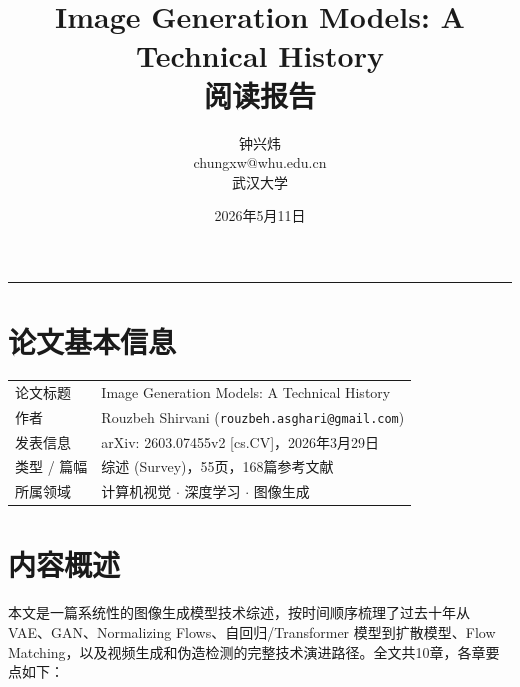 \documentclass[11pt,a4paper]{ctexart}
\title{{\bfseries Image Generation Models: A Technical History\\[3mm] 阅读报告}}
\author{%
    \large 钟兴炜\\[2mm]
    \normalsize chungxw@whu.edu.cn\\[1mm]
    \small 武汉大学
}
\date{\small 2026年5月11日}
\begin{document}
\maketitle
\thispagestyle{empty}

\vspace{3mm}
\begin{center}
\rule{0.7\textwidth}{0.5pt}
\end{center}
\vspace{3mm}

\section{论文基本信息}

\begin{tabularx}{\textwidth}{@{}l>{\raggedright\arraybackslash}X@{}}
\toprule
论文标题  & Image Generation Models: A Technical History \\
作者      & Rouzbeh Shirvani \quad (\texttt{rouzbeh.asghari@gmail.com}) \\
发表信息  & arXiv: 2603.07455v2 [cs.CV]，2026年3月29日 \\
类型 / 篇幅 & 综述 (Survey)，55页，168篇参考文献 \\
所属领域  & 计算机视觉 $\cdot$ 深度学习 $\cdot$ 图像生成 \\
\bottomrule
\end{tabularx}

\section{内容概述}

本文是一篇系统性的图像生成模型技术综述，按时间顺序梳理了过去十年从 VAE、GAN、Normalizing Flows、自回归/Transformer 模型到扩散模型、Flow Matching，以及视频生成和伪造检测的完整技术演进路径。全文共10章，各章要点如下：
\end{document}
